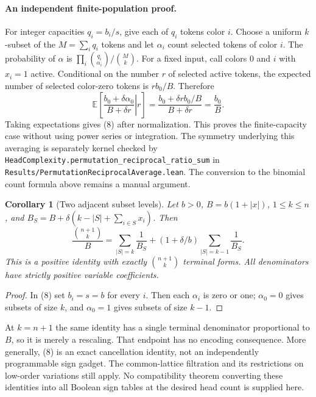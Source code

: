 \documentclass[11pt]{article}
\newtheorem{corollary}[theorem]{Corollary}
\begin{document}
\paragraph{An independent finite-population proof.}
For integer capacities $q_i=b_i/s$, give each of $q_i$ tokens color $i$.
Choose a uniform $k$-subset of the $M=\sum_i q_i$ tokens and let
$\alpha_i$ count selected tokens of color $i$. The probability of
$\alpha$ is $\prod_i\binom{q_i}{\alpha_i}/\binom Mk$.
For a fixed input, call colors $0$ and $i$ with $x_i=1$ active.
Conditional on the number $r$ of selected active tokens, the expected
number of selected color-zero tokens is $r b_0/B$. Therefore
\[
 \mathbb E\left[\left.
      \frac{b_0+\delta\alpha_0}{B+\delta r}\right|r\right]
      =\frac{b_0+\delta r b_0/B}{B+\delta r}
      =\frac{b_0}{B}.
\]
Taking expectations gives (8) after normalization. This proves the
finite-capacity case without using power series or integration.
The symmetry underlying this averaging is separately kernel checked
by \texttt{HeadComplexity.permutation\_reciprocal\_ratio\_sum}
in \texttt{Results/PermutationReciprocalAverage.lean}. The conversion
to the binomial count formula above remains a manual argument.

\begin{corollary}[Two adjacent subset levels]
Let $b>0$, $B=b(1+|x|)$, $1\le k\le n$, and
$B_S=B+\delta(k-|S|+\sum_{i\in S}x_i)$. Then
\[
 \frac{\binom{n+1}{k}}{B}
   =\sum_{|S|=k}\frac1{B_S}
       +(1+\delta/b)\sum_{|S|=k-1}\frac1{B_S}.
 \tag{10}
\]
This is a positive identity with exactly $\binom{n+1}{k}$ terminal
forms. All denominators have strictly positive variable coefficients.
\end{corollary}
\begin{proof}
In (8) set $b_i=s=b$ for every $i$. Then each $\alpha_i$ is zero
or one; $\alpha_0=0$ gives subsets of size $k$, and
$\alpha_0=1$ gives subsets of size $k-1$.
\end{proof}

At $k=n+1$ the same identity has a single terminal denominator
proportional to $B$, so it is merely a rescaling. That endpoint
has no encoding consequence. More generally, (8) is an exact
cancellation identity, not an independently programmable sign gadget.
The common-lattice filtration and its restrictions on low-order
variations still apply. No compatibility theorem converting these
identities into all Boolean sign tables at the desired head count
is supplied here.
\end{document}
